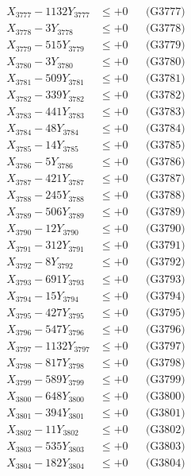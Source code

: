 \documentclass[a4paper,10pt]{article}
\begin{document}
{\begin{align}
X_{3777} - 1132Y_{3777} &\leq +0 && \text{(G3777)} \\
X_{3778} - 3Y_{3778} &\leq +0 && \text{(G3778)} \\
X_{3779} - 515Y_{3779} &\leq +0 && \text{(G3779)} \\
X_{3780} - 3Y_{3780} &\leq +0 && \text{(G3780)} \\
\allowbreak
X_{3781} - 509Y_{3781} &\leq +0 && \text{(G3781)} \\
X_{3782} - 339Y_{3782} &\leq +0 && \text{(G3782)} \\
X_{3783} - 441Y_{3783} &\leq +0 && \text{(G3783)} \\
X_{3784} - 48Y_{3784} &\leq +0 && \text{(G3784)} \\
X_{3785} - 14Y_{3785} &\leq +0 && \text{(G3785)} \\
X_{3786} - 5Y_{3786} &\leq +0 && \text{(G3786)} \\
X_{3787} - 421Y_{3787} &\leq +0 && \text{(G3787)} \\
X_{3788} - 245Y_{3788} &\leq +0 && \text{(G3788)} \\
X_{3789} - 506Y_{3789} &\leq +0 && \text{(G3789)} \\
X_{3790} - 12Y_{3790} &\leq +0 && \text{(G3790)} \\
\allowbreak
X_{3791} - 312Y_{3791} &\leq +0 && \text{(G3791)} \\
X_{3792} - 8Y_{3792} &\leq +0 && \text{(G3792)} \\
X_{3793} - 691Y_{3793} &\leq +0 && \text{(G3793)} \\
X_{3794} - 15Y_{3794} &\leq +0 && \text{(G3794)} \\
X_{3795} - 427Y_{3795} &\leq +0 && \text{(G3795)} \\
X_{3796} - 547Y_{3796} &\leq +0 && \text{(G3796)} \\
X_{3797} - 1132Y_{3797} &\leq +0 && \text{(G3797)} \\
X_{3798} - 817Y_{3798} &\leq +0 && \text{(G3798)} \\
X_{3799} - 589Y_{3799} &\leq +0 && \text{(G3799)} \\
X_{3800} - 648Y_{3800} &\leq +0 && \text{(G3800)} \\
\allowbreak
X_{3801} - 394Y_{3801} &\leq +0 && \text{(G3801)} \\
X_{3802} - 11Y_{3802} &\leq +0 && \text{(G3802)} \\
X_{3803} - 535Y_{3803} &\leq +0 && \text{(G3803)} \\
X_{3804} - 182Y_{3804} &\leq +0 && \text{(G3804)} \\

\end{align}}
\end{document}
